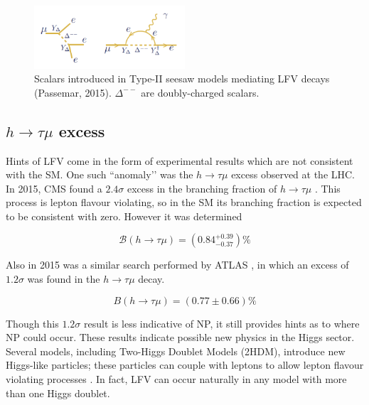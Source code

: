 \documentclass[12pt]{thesis}  %
\newcommand{\br}{\mathcal{B}}
\newcommand{\htm}{h\to \tau \mu}
\begin{document}
\begin{figure}[h]
\centering
\includegraphics[width=0.5\textwidth]{images/seesaw-lfv-modes.png}
\caption[]%
{{\small Scalars introduced in Type-II seesaw models mediating LFV decays (Passemar, 2015). $\Delta^{--}$ are doubly-charged scalars.}}
\label{}
\end{figure}

\subsection{$\htm$ excess}

Hints of LFV come in the form of experimental results which are not consistent with the SM. One such ``anomaly’’ was the $\htm$ excess observed at the LHC. In 2015, CMS found a $2.4\sigma$ excess in the branching fraction of $\htm$ \cite{Khachatryan:2015}. This process is lepton flavour violating, so in the SM its branching fraction is expected to be consistent with zero. However it was determined

\begin{equation}
\br(h\to \tau \mu) = (0.84^{+0.39}_{-0.37})\%
\end{equation}

Also in 2015 was a similar search performed by ATLAS \cite{Aad:2015}, in which an excess of $1.2\sigma$ was found in the $\htm$ decay. 

\begin{equation}
B(\htm) = (0.77 \pm 0.66)\%
\end{equation}

Though this $1.2\sigma$ result is less indicative of NP, it still provides hints as to where NP could occur. These results indicate possible new physics in the Higgs sector. Several models, including Two-Higgs Doublet Models (2HDM), introduce new Higgs-like particles; these particles can couple with leptons to allow lepton flavour violating processes \cite{Harnik:2012}. In fact, LFV can occur naturally in any model with more than one Higgs doublet.
\end{document}
